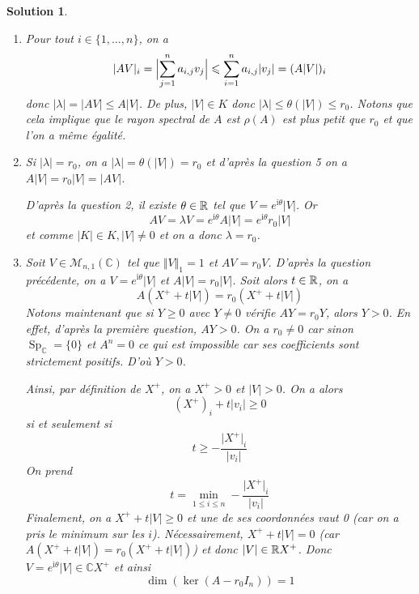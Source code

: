 \documentclass[12pt]{article}
\newtheorem{solution}{Solution}[section]
\theoremstyle{remark}
\newcommand{\C}{\mathbb{C}} \newcommand{\Q}{\mathbb{Q}}
\newcommand{\M}{\mathcal{M}} \renewcommand{\L}{\mathcal{L}}
\DeclareMathOperator{\Sp}{Sp} \DeclareMathOperator{\mat}{mat}
\begin{document}
\begin{solution}
\begin{enumerate}
		\item Pour tout $i\in\{1,\dots,n\}$, on a 
		$$\vert AV\vert_{i}=\Bigl\lvert\sum_{j=1}^{n}a_{i,j}v_{j}\Bigr\rvert\leqslant\sum_{i=1}^{n}a_{i,j}\vert v_{j}\vert=(A\vert V\vert)_{i}$$
		donc $\vert\lambda\vert=\vert AV\vert\leqslant A\vert V\vert$. De plus, $\vert V\vert\in K$ donc $\vert\lambda\vert\leqslant\theta(\vert V\vert)\leqslant r_{0}$. Notons que cela implique que le rayon spectral de $A$ est $\rho(A)$ est plus petit que $r_{0}$ et que l'on a même égalité.

		\item Si $\vert\lambda\vert=r_{0}$, on a $\vert\lambda\vert=\theta(\vert V\vert)=r_{0}$ et d'après la question 5 on a $A\vert V\vert=r_{0}\vert V\vert=\vert AV\vert$.
		
		D'après la question 2, il existe $\theta\in\mathbb{R}$ tel que $V=e^{\mathrm{i}\theta}\vert V\vert$. Or 
		$$AV=\lambda V=e^{\mathrm{i}\theta}A\vert V\vert=e^{\mathrm{i}\theta}r_{0}\vert V\vert$$
		et comme $\vert K\vert\in K, \vert V\vert\neq0$ et on a donc $\lambda=r_{0}$.

		\item Soit $V\in\M_{n,1}(\C)$ tel que $\Vert V\Vert_{1}=1$ et $AV=r_{0}V$. D'après la question précédente, on a $V=e^{\mathrm{i}\theta}\vert V\vert$ et $A\vert V\vert=r_{0}\vert V\vert$. Soit alors $t\in\mathbb{R}$, on a 
		$$A(X^{+}+t\vert V\vert)=r_{0}(X^{+}+t\vert V\vert)$$
		Notons maintenant que si $Y\geqslant0$ avec $Y\neq0$ vérifie $AY=r_{0}Y$, alors $Y>0$. En effet, d'après la première question, $AY>0$. On a $r_{0}\neq0$ car sinon $\Sp_{\C}=\{0\}$ et $A^{n}=0$ ce qui est impossible car ses coefficients sont strictement positifs. D'où $Y>0$.

		Ainsi, par définition de $X^{+}$, on a $X^{+}>0$ et $\vert V\vert>0$. On a alors 
		$$(X^{+})_{i}+t\vert v_{i}\vert\geqslant0$$
		si et seulement si
		$$t\geqslant -\frac{\vert X^{+}\vert_{i}}{\vert v_{i}\vert}$$
		On prend 
		$$t=\min\limits_{1\leqslant i\leqslant n}-\frac{\vert X^{+}\vert_{i}}{\vert v_{i}\vert}$$
		Finalement, on a $X^{+}+t\vert V\vert\geqslant0$ et une de ses coordonnées vaut 0 (car on a pris le minimum sur les $i$). Nécessairement, $X^{+}+t\vert V\vert=0$ (car $A(X^{+}+t\vert V\vert)=r_{0}(X^{+}+t\vert V\vert)$) et donc $\vert V\vert\in\mathbb{R} X^{+}$. Donc $V=e^{\mathrm{i}\theta}\vert V\vert\in\C X^{+}$ et ainsi 
		$$\dim(\ker(A-r_{0}I_{n}))=1$$
	\end{enumerate}
\end{solution}
\end{document}
